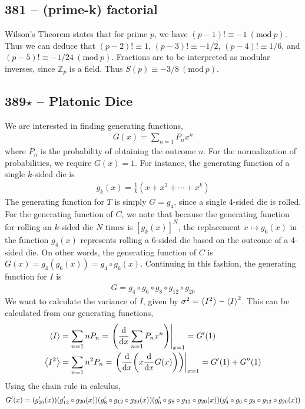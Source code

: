 \documentclass{article}
\newcommand{\Mod}[1]{\ (\mathrm{mod}\ #1)}
\begin{document}
\subsection*{381 -- (prime-k) factorial} 
Wilson's Theorem states that for prime $p$, we have $(p-1)! \equiv -1 \Mod{p}$. 
Thus we can deduce that $(p-2)! \equiv 1$, $(p-3)! \equiv -1/2$, $(p-4)! \equiv 1/6$, and $(p-5)! \equiv -1/24 \Mod{p}$.
Fractions are to be interpreted as modular inverses, since $\mathbb{Z}_p$ is a field.
Thus $S(p) \equiv -3/8 \Mod{p}$.

\subsection*{389$\star$ -- Platonic Dice}
We are interested in finding generating functions,
\begin{align*}
	G(x) = \sum_{n=1} P_n x^n
\end{align*}
where $P_n$ is the probability of obtaining the outcome $n$.
For the normalization of probabilities, we require $G(x) = 1$.
For instance, the generating function of a single $k$-sided die is
\begin{align*}
	g_k(x) = \frac{1}{k}(x + x^2 + \cdots + x^k)
\end{align*}
The generating function for $T$ is simply $G = g_4$, since a single 4-sided die is rolled.
For the generating function of $C$, we note that because the generating function for rolling an $k$-sided die $N$ times is $[g_k(x)]^N$, the replacement $x \mapsto g_6(x)$ in the function $g_4(x)$ represents rolling a 6-sided die based on the outcome of a 4-sided die.
On other words, the generating function of $C$ is $G(x) = g_4(g_6(x)) = g_4 \circ g_6(x)$.
Continuing in this fashion, the generating function for $I$ is
\begin{align*}
	G = g_4 \circ g_6 \circ g_8 \circ g_{12} \circ g_{20}
\end{align*}
We want to calculate the variance of $I$, given by $\sigma^2 = \ev{I^2} - \ev{I}^2$.
This can be calculated from our generating functions,
\begin{align*}
	\ev{I} &= \sum_{n=1} n P_n = \eval{\qty( \dv{x} \sum_{n=1} P_n x^n)}_{x=1} = G'(1) \\
	\ev{I^2} &= \sum_{n=1} n^2 P_n = \eval{\qty(\dv{x} \qty( x \dv{x} G(x) ))}_{x=1} = G'(1) + G''(1) 
\end{align*}
Using the chain rule in calculus,
\begin{align*}
	G'(x) = \qty( g'_{20}(x)) \qty( g'_{12} \circ g_{20}(x))\qty( g'_8 \circ g_{12} \circ g_{20}(x)) \qty( g'_6 \circ g_8 \circ g_{12} \circ g_{20}(x))\qty( g'_4 \circ g_6 \circ g_8 \circ g_{12} \circ g_{20}(x) )
\end{align*}
\end{document}
